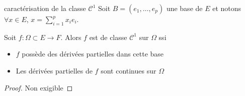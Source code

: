 \begin{theoreme}{caractérisation de la classe $\mathscr C^1$}{}
    Soit $B = (e_1, \ldots, e_p)$ une base de $E$ et notons $\forall x \in E$, 
    $x = \displaystyle \sum_{i = 1 }^{p } x_i e_i$.

    Soit $f : \Omega \subset E \to F$. Alors $f$ est de classe $\mathscr C^1$ sur $\Omega$ ssi
    \begin{itemize}
        \item $f$ possède des dérivées partielles dans cette base 
        \item Les dérivées partielles de $f$ sont continues sur $\Omega$
    \end{itemize}
\end{theoreme}

\begin{proof}
    Non exigible 
\end{proof}

